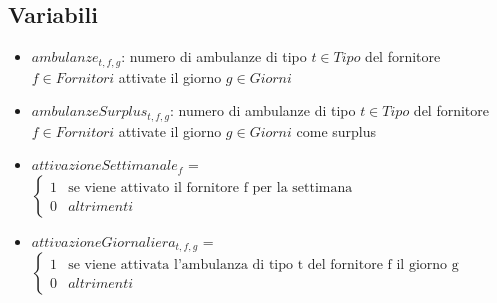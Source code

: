 \subsection{Variabili}
\begin{itemize}
    \item $ambulanze_{t, f, g}$: numero di ambulanze di tipo $t \in Tipo$ del fornitore $f \in Fornitori$ attivate il giorno $g \in Giorni$
    \item $ambulanzeSurplus_{t, f, g}$: numero di ambulanze di tipo $t \in Tipo$ del fornitore $f \in Fornitori$ attivate il giorno $g \in Giorni$ come surplus
    \item $attivazioneSettimanale_{f}$ = 
    \(
    \begin{cases}
        1 & \text{se viene attivato il fornitore f per la settimana} \\
        0 & altrimenti
    \end{cases}\)
    \item $attivazioneGiornaliera_{t, f, g}$ = 
    \(
    \begin{cases}
        1 & \text{se viene attivata l'ambulanza di tipo t del fornitore f il giorno g} \\
        0 & altrimenti
    \end{cases}\)
\end{itemize}
